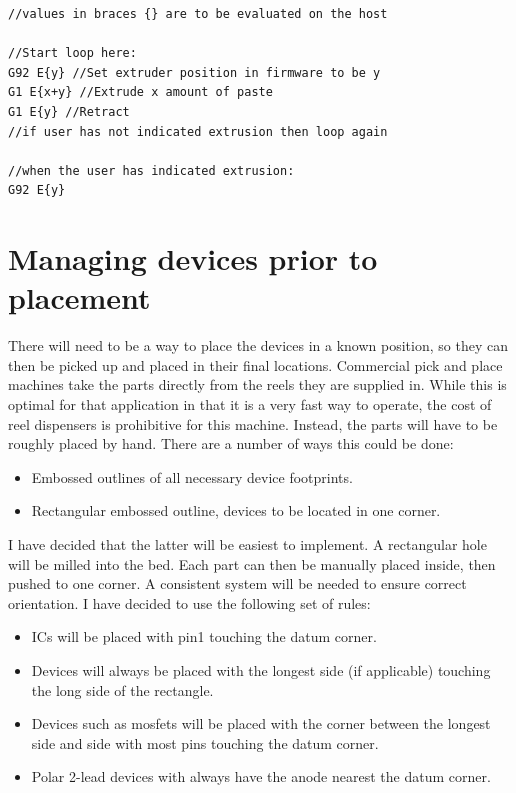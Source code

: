 \documentclass[a4paper,11pt]{article}  %
\begin{document}
\begin{lstlisting}[frame=single]
//values in braces {} are to be evaluated on the host

//Start loop here:
G92 E{y} //Set extruder position in firmware to be y
G1 E{x+y} //Extrude x amount of paste
G1 E{y} //Retract
//if user has not indicated extrusion then loop again

//when the user has indicated extrusion:
G92 E{y}
\end{lstlisting}
	  
\section{Managing devices prior to placement}
There will need to be a way to place the devices in a known position, so they can then be picked up and placed in their final locations.
Commercial pick and place machines take the parts directly from the reels they are supplied in. While this is optimal for that application in that
it is a very fast way to operate, the cost of reel dispensers is prohibitive for this machine. Instead, the parts will have to be roughly placed
by hand. There are a number of ways this could be done:

\begin{itemize} \itemsep0em
	\item	Embossed outlines of all necessary device footprints.
	\item	Rectangular embossed outline, devices to be located in one corner.
\end{itemize}

I have decided that the latter will be easiest to implement. A rectangular hole will be milled into the bed. Each part can then
be manually placed inside, then pushed to one corner. A consistent system will be needed to ensure correct orientation. I have decided to use
the following set of rules:

\begin{itemize} \itemsep0em
	\item	ICs will be placed with pin1 touching the datum corner.
	\item	Devices will always be placed with the longest side (if applicable) touching the long side of the rectangle.
	\item	Devices such as mosfets will be placed with the corner between the longest side and side with most pins touching the datum corner.
	\item	Polar 2-lead devices with always have the anode nearest the datum corner.
\end{itemize}
\end{document}
